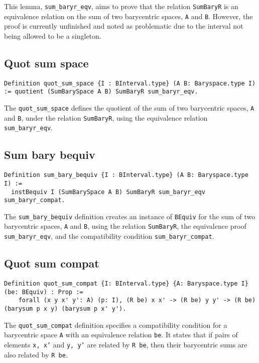 \documentclass[a4paper,10pt]{article} %
\begin{document}
This lemma, \texttt{sum\_baryr\_eqv}, aims to prove that the relation \texttt{SumBaryR} is an equivalence relation on the sum of two barycentric spaces, \texttt{A} and \texttt{B}. However, the proof is currently unfinished and noted as problematic due to the interval not being allowed to be a singleton.

\subsection{Quot sum space}
\begin{lstlisting}
Definition quot_sum_space {I : BInterval.type} (A B: Baryspace.type I) := quotient (SumBarySpace A B) SumBaryR sum_baryr_eqv.
\end{lstlisting}

The \texttt{quot\_sum\_space} defines the quotient of the sum of two barycentric spaces, \texttt{A} and \texttt{B}, under the relation \texttt{SumBaryR}, using the equivalence relation \texttt{sum\_baryr\_eqv}.

\subsection{Sum bary bequiv}
\begin{lstlisting}
Definition sum_bary_bequiv {I : BInterval.type} (A B: Baryspace.type I) := 
  instBequiv I (SumBarySpace A B) SumBaryR sum_baryr_eqv sum_baryr_compat.
\end{lstlisting}
The \texttt{sum\_bary\_bequiv} definition creates an instance of \texttt{BEquiv} for the sum of two barycentric spaces, \texttt{A} and \texttt{B}, using the relation \texttt{SumBaryR}, the equivalence proof \texttt{sum\_baryr\_eqv}, and the compatibility condition \texttt{sum\_baryr\_compat}.

\subsection{Quot sum compat}
\begin{lstlisting}
Definition quot_sum_compat {I: BInterval.type} {A: Baryspace.type I} (be: BEquiv) : Prop := 
    forall (x y x' y': A) (p: I), (R be) x x' -> (R be) y y' -> (R be) (barysum p x y) (barysum p x' y').
\end{lstlisting}
The \texttt{quot\_sum\_compat} definition specifies a compatibility condition for a barycentric space \texttt{A} with an equivalence relation \texttt{be}. It states that if pairs of elements \texttt{x, x'} and \texttt{y, y'} are related by \texttt{R be}, then their barycentric sums are also related by \texttt{R be}.
\end{document}
